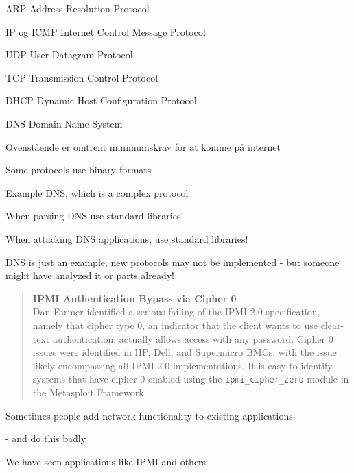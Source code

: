 \documentclass[Screen16to9,17pt]{foils}
\begin{document}


\begin{list1}
\item ARP Address Resolution Protocol
\item IP og ICMP Internet Control Message Protocol
\item UDP User Datagram Protocol
\item TCP Transmission Control Protocol
\item DHCP Dynamic Host Configuration Protocol
\item DNS Domain Name System
\end{list1}
\vskip 1cm
\centerline{Ovenstående er omtrent minimumskrav for at komme på internet}


\begin{list2}
\item Some protocols use binary formats
\item Example DNS, which is a complex protocol
\item When parsing DNS use standard libraries!
\item When attacking DNS applications, use standard libraries! \smiley
\item DNS is just an example, new protocols may not be implemented - but someone might have analyzed it or parts already!
\end{list2}




\begin{quote}{\bf
  IPMI Authentication Bypass via Cipher 0}\\
  Dan Farmer identified a serious failing of the IPMI 2.0 specification, namely that cipher type 0, an indicator that the client wants to use clear-text authentication, actually allows access with any password. Cipher 0 issues were identified in HP, Dell, and Supermicro BMCs, with the issue likely encompassing all IPMI 2.0 implementations. It is easy to identify systems that have cipher 0 enabled using the \verb+ipmi_cipher_zero+ module in the Metasploit Framework.
\end{quote}

\begin{list2}
\item Sometimes people add network functionality to existing applications
\item - and do this badly
\item We have seen applications like IPMI and others
\end{list2}
\end{document}
